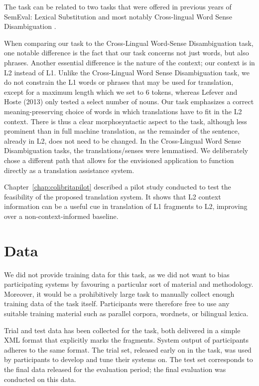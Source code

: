 The task can be related to two tasks that were offered in previous
years of SemEval: Lexical Substitution \cite{CLLS} and most notably Cross-lingual Word Sense Disambiguation \cite{Lefever2013}. 

When comparing our task to the Cross-Lingual Word-Sense Disambiguation task,
one notable difference is the fact that our task concerns not just words, but
also phrases. Another essential difference is the nature of the context; our
context is in L2 instead of L1. Unlike the Cross-Lingual Word Sense
Disambiguation task, we do not constrain the L1 words or phrases that may be
used for translation, except for a maximum length which we set to 6 tokens,
whereas Lefever and Hoste (2013) only tested a select number of nouns. Our task
emphasizes a correct meaning-preserving choice of words in which translations
have to fit in the L2 context. There is thus a clear morphosyntactic aspect to
the task, although less prominent than in full machine translation, as the
remainder of the sentence, already in L2, does not need to be changed.  In the
Cross-Lingual Word Sense Disambiguation tasks, the translations/senses were
lemmatised. We deliberately chose a different path that allows for the
envisioned application to function directly as a translation assistance system.

Chapter~\ref{chap:colibritapilot} described a pilot study conducted to test the
feasibility of the proposed translation system. It shows that L2 context
information can be a useful cue in translation of L1 fragments to L2, improving
over a non-context-informed baseline.


\section{Data}
\label{sec:data}

We did not provide training data for this task, as we did not want to bias
participating systems by favouring a particular sort of material and
methodology. Moreover, it would be a prohibitively large task to manually
collect enough training data of the task itself. Participants were therefore
free to use any suitable training material such as parallel corpora, wordnets,
or bilingual lexica.

Trial and test data has been collected for the task, both delivered in a simple
XML format that explicitly marks the fragments. System output of participants
adheres to the same format. The trial set, released early on in the task, was
used by participants to develop and tune their systems on. The test set
corresponds to the final data released for the evaluation period; the final
evaluation was conducted on this data.

